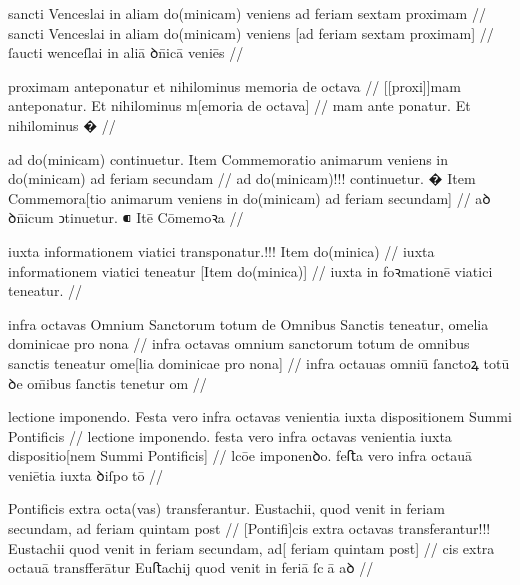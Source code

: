 \ex \bg
\gla
{}
sancti Venceslai in aliam do(minicam) veniens ad feriam sextam proximam
//
\glRekonstrukcja
{}
sancti Venceslai in aliam do(minicam) veniens [ad feriam sextam proximam]
//
\glU
{}
ſaucti wenceſlai in aliā ꝺn̄icā veniēs    
//
\endgl
\eg



\ex \bg
\gla
{}
proximam anteponatur et nihilominus memoria de octava
//
\glRekonstrukcja
{}
[[proxi]]mam anteponatur. Et nihilominus m[emoria de octava]
//
\glU
{}
mam {ante ponatur}. Et nihilominus �  
//
\endgl
\eg



\ex \bg
\gla
{}
ad do(minicam) continuetur.
{} Item Commemoratio animarum veniens in do(minicam) ad feriam
secundam 
//
\glRekonstrukcja
{}
ad do(minicam)!!! continuetur.
� Item Commemora[tio animarum veniens in do(minicam) ad feriam
secundam] 
//
\glU
{}
aꝺ ꝺn̄icum ↄtinuetur. ⁌ Itē Cōmemoꝛa       
//
\endgl
\eg



\ex \bg
\gla
{}
iuxta informationem viatici transponatur.!!! {}
Item do(minica)
//
\glRekonstrukcja
{}
iuxta informationem viatici {} teneatur
[Item do(minica)]
//
\glU
{}
iuxta {in foꝛmationē} viatici {} teneatur.  
//
\endgl
\eg


\ex \bg
\gla
{}
infra octavas Omnium Sanctorum totum de Omnibus Sanctis teneatur, omelia dominicae pro nona
//
\glRekonstrukcja
{}
infra octavas omnium sanctorum totum de omnibus sanctis teneatur ome[lia dominicae pro nona]
//
\glU
{}
infra octauas omniū ſanctoꝝ totū ꝺe om̄ibus ſanctis tenetur om   
//
\endgl
\eg



\ex \bg
\gla
{}
lectione imponendo.
Festa vero infra octavas venientia iuxta dispositionem Summi
Pontificis
//
\glRekonstrukcja
{}
lectione imponendo.
festa vero infra octavas venientia iuxta dispositio[nem Summi
Pontificis]
//
\glU
{}
lcōe imponenꝺo. feﬅa vero infra octauā veniētia iuxta ꝺiſpotō  
//
\endgl
\eg



\ex \bg
\gla
{}
Pontificis extra octa(vas) transferantur.
Eustachii, quod venit in feriam secundam, ad feriam quintam
post 
//
\glRekonstrukcja
{}
[Pontifi]cis extra octavas transferantur!!!
Eustachii quod venit in feriam secundam, ad[ feriam quintam
post] 
//
\glU
{}
cis extra octauā transfferātur Euﬅachij quod venit in feriā ſcā aꝺ   
//
\endgl
\eg



